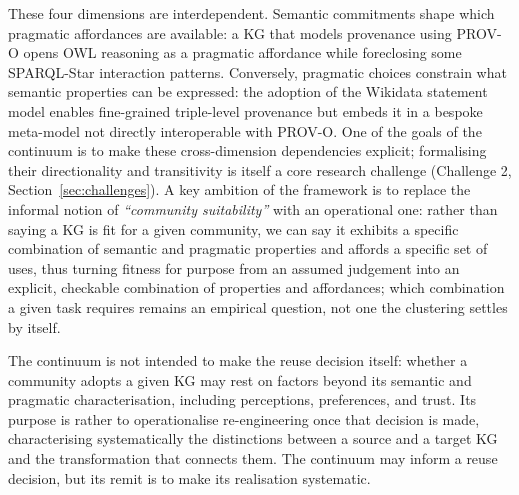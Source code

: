 \documentclass[runningheads]{llncs}
\newcommand{\add}[1]{\textcolor{addedcolor}{#1}}
\newenvironment{onlyextended}{\ignorespaces}{\ignorespacesafterend}
\begin{document}
\begin{onlyextended}
These four dimensions are interdependent.
Semantic commitments shape which pragmatic affordances are available: a KG that models provenance using PROV-O opens OWL reasoning as a pragmatic affordance while foreclosing some SPARQL-Star interaction patterns. 
Conversely, pragmatic choices constrain what semantic properties can be expressed: the adoption of the Wikidata statement model enables fine-grained triple-level provenance but embeds it in a bespoke meta-model not directly interoperable with PROV-O. 
One of the goals of the continuum is to make these cross-dimension dependencies explicit; formalising their directionality and transitivity is itself a core research challenge (Challenge 2, Section~\ref{sec:challenges}). A key ambition of the framework is to replace the informal notion of \textit{``community suitability''} with an operational one: rather than saying a KG is fit for a given community, we can say it exhibits a specific combination of semantic and pragmatic properties and affords a specific set of uses, thus turning fitness for purpose from an assumed judgement into an explicit, checkable combination of properties and affordances; which combination a given task requires remains an empirical question, not one the clustering settles by itself. %
% 

The continuum is not intended to make the reuse decision itself: whether a community adopts a given KG may rest on factors beyond its semantic and pragmatic characterisation, including perceptions, preferences, and trust.
Its purpose is rather to operationalise re-engineering once that decision is made, characterising systematically the distinctions between a source and a target KG and the transformation that connects them.
The continuum may inform a reuse decision, but its remit is to make its realisation systematic.
\end{onlyextended}

\end{document}
